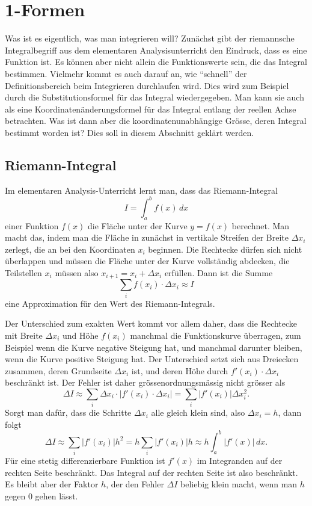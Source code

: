 %
%
\section{1-Formen}
Was ist es eigentlich, was man integrieren will?
Zunächst gibt der riemannsche Integralbegriff aus dem elementaren
Analysisunterricht den Eindruck, dass es eine Funktion ist.
Es können aber nicht allein die Funktionswerte sein, die das Integral
bestimmen.
Vielmehr kommt es auch darauf an, wie ``schnell'' der Definitionsbereich
beim Integrieren durchlaufen wird.
Dies wird zum Beispiel durch die Substitutionsformel für das Integral
wiedergegeben.
Man kann sie auch als eine Koordinatenänderungsformel für das Integral
entlang der reellen Achse betrachten.
Was ist dann aber die koordinatenunabhängige Grösse, deren Integral
bestimmt worden ist?
Dies soll in diesem Abschnitt geklärt werden.

%
%
\subsection{Riemann-Integral}
Im elementaren Analysis-Unterricht lernt man, dass das Riemann-Integral
\[
I
=
\int_a^b f(x)\,dx
\]
einer Funktion $f(x)$ die Fläche unter der Kurve $y=f(x)$ berechnet.
Man macht das, indem man die Fläche in zunächst in vertikale Streifen
der Breite $\Delta x_i$ zerlegt, die an bei den Koordinaten $x_i$
beginnen.
Die Rechtecke dürfen sich nicht überlappen und müssen die Fläche unter
der Kurve vollständig abdecken, die Teilstellen $x_i$ müssen
also $x_{i+1}=x_i+\Delta x_i$ erfüllen.
Dann ist die Summe
\begin{equation}
\sum_{i} f(x_i)\cdot \Delta x_i
\approx 
I
\label{buch:kurvenintegral:1-form:eqn:riemann-summe}
\end{equation}
eine Approximation für den Wert des Riemann-Integrals.

Der Unterschied zum exakten Wert kommt vor allem daher, dass die
Rechtecke mit Breite $\Delta x_i$ und Höhe $f(x_i)$ manchmal
die Funktionskurve überragen, zum Beispiel wenn die Kurve negative
Steigung hat, und manchmal darunter bleiben, wenn die Kurve positive
Steigung hat.
Der Unterschied setzt sich aus Dreiecken zusammen, deren Grundseite
$\Delta x_i$ ist, und deren Höhe durch $f'(x_i)\cdot \Delta x_i$
beschränkt ist.
Der Fehler ist daher grössenordnungsmässig nicht grösser als
\[
\Delta I
\approx
\sum_i \Delta x_i \cdot |f'(x_i)\cdot \Delta x_i|
=
\sum_i |f'(x_i)| \Delta x_i^2.
\]
Sorgt man dafür, dass die Schritte $\Delta x_i$ alle gleich klein
sind, also $\Delta x_i=h$, dann folgt
\[
\Delta I
\approx
\sum_i |f'(x_i)| h^2
=
h\sum_i |f'(x_i)|h
\approx
h\int_a^b |f'(x)|\,dx.
\]
Für eine stetig differenzierbare Funktion ist $f'(x)$ im Integranden
auf der rechten Seite beschränkt.
Das Integral auf der rechten Seite ist also beschränkt.
Es bleibt aber der Faktor $h$, der den Fehler $\Delta I$ beliebig
klein macht, wenn man $h$ gegen $0$ gehen lässt.

